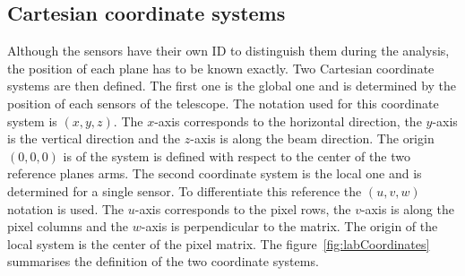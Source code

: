 
    \subsection{Cartesian coordinate systems}

    Although the sensors have their own ID to distinguish them during the analysis, the position of each plane has to be known exactly.
    Two Cartesian coordinate systems are then defined.
    The first one is the global one and is determined by the position of each sensors of the telescope.
    The notation used for this coordinate system is $(x,y,z)$.
    The $x$-axis corresponds to the horizontal direction, the $y$-axis is the vertical direction and the $z$-axis is along the beam direction.
    The origin $(0,0,0)$ is of the system is defined with respect to the center of the two reference planes arms.
    The second coordinate system is the local one and is determined for a single sensor.
    To differentiate this reference the $(u,v,w)$ notation is used.
    The $u$-axis corresponds to the pixel rows, the $v$-axis is along the pixel columns and the $w$-axis is perpendicular to the matrix.
    The origin of the local system is the center of the pixel matrix.
    The figure~\ref{fig:labCoordinates} summarises the definition of the two coordinate systems.

